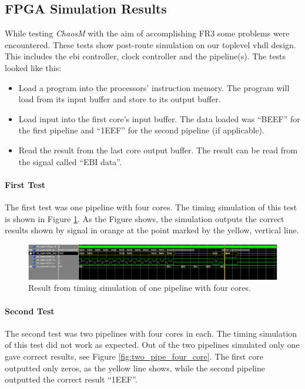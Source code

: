 
\subsection{FPGA Simulation Results}
While testing \textit{ChaosM} with the aim of accomplishing FR3
some problems were encountered. These tests show post-route simulation on our
toplevel vhdl design. This includes the ebi controller, clock controller and the pipeline(s).
The tests looked like this:

\begin{itemize}
\item Load a program into the processors’ instruction memory. The program will load from its input buffer and store to its output buffer.\\
\item Load input into the first core’s input buffer. The data loaded was “BEEF” for the first pipeline and “1EEF” for the second pipeline (if applicable).\\
\item Read the result from the last core output buffer. The result can be read from the signal called “EBI data”.\\
\end{itemize}


\paragraph{First Test}

The first test was one pipeline with four cores. The timing simulation of this
test is  shown in Figure \ref{fig:one_pipe_four_core}. As the Figure shows,
the simulation outputs the correct results shown by signal in orange at the
point  marked by the yellow, vertical line.

 \begin{figure}[H]
    \includegraphics[width=1.3\textwidth]{figures/fpga/result_1_pipe_4_cores.PNG}
    \caption{Result from timing simulation of one pipeline with four cores.}
    \label{fig:one_pipe_four_core}
\end{figure}

\paragraph{Second Test}
The second test was two pipelines with four cores in each. The timing simulation
of this test did not work as expected. Out of the two pipelines simulated only one
gave correct results, see Figure \ref{fig:two_pipe_four_core}. The first core
outputted only zeros, as the yellow line shows,  while the second pipeline outputted the correct result “1EEF”.

